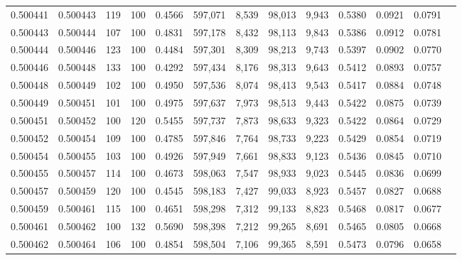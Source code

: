 \begin{tabular}{rrrrrrrrrrrrr}
0.500441 & 0.500443 &   119 & 100 &                                     0.4566 & 597,071 &   8,539 &  98,013 &   9,943 & 0.5380 & 0.0921 & 0.0791 \\
0.500443 & 0.500444 &   107 & 100 &                                     0.4831 & 597,178 &   8,432 &  98,113 &   9,843 & 0.5386 & 0.0912 & 0.0781 \\
0.500444 & 0.500446 &   123 & 100 &                                     0.4484 & 597,301 &   8,309 &  98,213 &   9,743 & 0.5397 & 0.0902 & 0.0770 \\
0.500446 & 0.500448 &   133 & 100 &                                     0.4292 & 597,434 &   8,176 &  98,313 &   9,643 & 0.5412 & 0.0893 & 0.0757 \\
0.500448 & 0.500449 &   102 & 100 &                                     0.4950 & 597,536 &   8,074 &  98,413 &   9,543 & 0.5417 & 0.0884 & 0.0748 \\
0.500449 & 0.500451 &   101 & 100 &                                     0.4975 & 597,637 &   7,973 &  98,513 &   9,443 & 0.5422 & 0.0875 & 0.0739 \\
0.500451 & 0.500452 &   100 & 120 &                                     0.5455 & 597,737 &   7,873 &  98,633 &   9,323 & 0.5422 & 0.0864 & 0.0729 \\
0.500452 & 0.500454 &   109 & 100 &                                     0.4785 & 597,846 &   7,764 &  98,733 &   9,223 & 0.5429 & 0.0854 & 0.0719 \\
0.500454 & 0.500455 &   103 & 100 &                                     0.4926 & 597,949 &   7,661 &  98,833 &   9,123 & 0.5436 & 0.0845 & 0.0710 \\
0.500455 & 0.500457 &   114 & 100 &                                     0.4673 & 598,063 &   7,547 &  98,933 &   9,023 & 0.5445 & 0.0836 & 0.0699 \\
0.500457 & 0.500459 &   120 & 100 &                                     0.4545 & 598,183 &   7,427 &  99,033 &   8,923 & 0.5457 & 0.0827 & 0.0688 \\
0.500459 & 0.500461 &   115 & 100 &                                     0.4651 & 598,298 &   7,312 &  99,133 &   8,823 & 0.5468 & 0.0817 & 0.0677 \\
0.500461 & 0.500462 &   100 & 132 &                                     0.5690 & 598,398 &   7,212 &  99,265 &   8,691 & 0.5465 & 0.0805 & 0.0668 \\
0.500462 & 0.500464 &   106 & 100 &                                     0.4854 & 598,504 &   7,106 &  99,365 &   8,591 & 0.5473 & 0.0796 & 0.0658 \\

\end{tabular}
